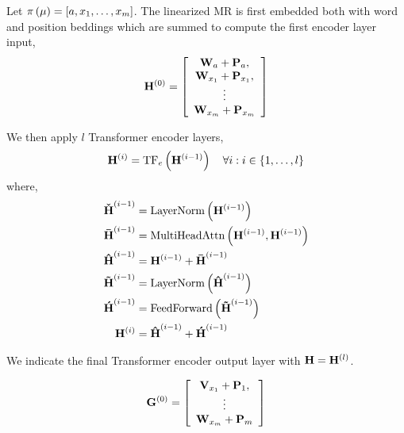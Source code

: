 Let $\pi\left(\mu\right) = \left[a, x_1, \ldots, x_m \right]$.
The linearized MR is first embedded both with word and position
beddings which are summed to compute the first encoder layer input,
\[ \mathbf{H}^{(0)} = \left[\begin{array}{c}
        \mathbf{W}_{a} + \mathbf{P}_{a}, \\
        \mathbf{W}_{x_1} + \mathbf{P}_{x_1},\\
        \vdots\\
    \mathbf{W}_{x_m} + \mathbf{P}_{x_m}\end{array} \right] \]

We then apply $l$ Transformer encoder layers, 
\[ \mathbf{H}^{(i)} = \operatorname{TF}_e\left(\mathbf{H}^{(i-1)}\right)\quad  \forall i: i \in \{1,\ldots,l\}  \]
where,
\begin{align*}
    \boldsymbol{\check{\mathbf{H}}}^{(i-1)} &= \operatorname{LayerNorm}\left(\mathbf{H}^{(i-1)}\right)\\
    \boldsymbol{\bar{\mathbf{H}}}^{(i-1)} &= \operatorname{MultiHeadAttn}\left(\mathbf{H}^{(i-1)},\mathbf{H}^{(i-1)}\right)\\
    \boldsymbol{\hat{\mathbf{H}}}^{(i-1)} &= \mathbf{H}^{(i-1)} + \boldsymbol{\bar{\mathbf{H}}}^{(i-1)}\\
    \boldsymbol{\tilde{\mathbf{H}}}^{(i-1)} &= \operatorname{LayerNorm}\left(
        \boldsymbol{\hat{\mathbf{H}}}^{(i-1)} \right)\\
    \boldsymbol{\acute{\mathbf{H}}}^{(i-1)} &= \operatorname{FeedForward}\left(
        \boldsymbol{\tilde{\mathbf{H}}}^{(i-1)} \right)\\
\mathbf{H}^{(i)} & =  \boldsymbol{\hat{\mathbf{H}}}^{(i-1)} +
  \boldsymbol{\acute{\mathbf{H}}}^{(i-1)} 
\end{align*}

We indicate the final Transformer encoder output layer with $\mathbf{H} = \mathbf{H}^{(l)}$.


\[ \mathbf{G}^{(0)} = \left[\begin{array}{c}
        \mathbf{V}_{x_1} + \mathbf{P}_{1},\\
        \vdots\\
    \mathbf{W}_{x_m} + \mathbf{P}_{m}\end{array} \right] \]


